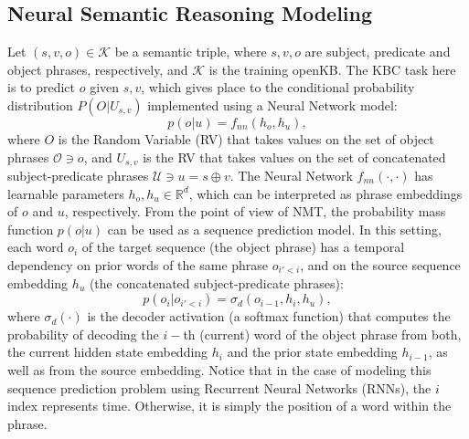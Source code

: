 \documentclass[preprint]{elsarticle}
\begin{document}
\subsection{Neural Semantic Reasoning Modeling}\label{sec:04_neural_reasoning_modeling}
Let $(s, v, o)\in\mathcal{K}$ be a semantic triple, where $s, v, o$ are subject, predicate and object phrases, respectively, and $\mathcal{K}$ is the training openKB. The KBC task here is to predict $o$ given $s,v$, which gives place to the conditional probability distribution $P(O|U_{s,v})$ implemented using a Neural Network model:
$$p(o|u)=f_{nn}(h_o,h_u),$$
\noindent where $O$ is the Random Variable (RV) that takes values on the set of object phrases $\mathcal{O}\ni o$, and $U_{s,v}$ is the RV that takes values on the set of concatenated subject-predicate phrases $\mathcal{U}\ni u=s\oplus v$. The Neural Network $f_{nn}(\cdot,\cdot)$ has learnable parameters $h_o,h_u\in\mathbb{R}^d$, which can be interpreted as phrase embeddings of $o$ and $u$, respectively. From the point of view of NMT, the probability mass function $p(o|u)$ can be used as a sequence prediction model. In this setting, each word $o_i$ of the target sequence (the object phrase) has a temporal dependency on prior words of the same phrase $o_{i'<i}$, and on the source sequence embedding $h_u$ (the concatenated subject-predicate phrases):
\begin{equation}
    \label{eq:seq_conditional}
    p(o_i|o_{i'<i}) = \sigma_d(o_{i-1},h_{i},h_{u}),
\end{equation}
\noindent where $\sigma_d(\cdot)$ is the decoder activation (a softmax function) that computes the probability of decoding the $i-$th (current) word of the object phrase from both, the current hidden state embedding $h_i$ and the prior state embedding $h_{i-1}$, as well as from the source embedding. Notice that in the case of modeling this sequence prediction problem using Recurrent Neural Networks (RNNs), the $i$ index represents time. Otherwise, it is simply the position of a word within the phrase.

\end{document}
